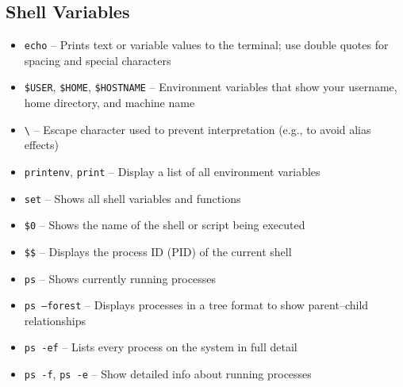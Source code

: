 \documentclass[a4paper,12pt=]{article}
\begin{document}
\subsection{Shell Variables}
    \begin{itemize}
        \item \texttt{echo} – Prints text or variable values to the terminal; use double quotes for spacing and special characters
        \item \texttt{\$USER}, \texttt{\$HOME}, \texttt{\$HOSTNAME} – Environment variables that show your username, home directory, and machine name
        \item \texttt{\textbackslash} – Escape character used to prevent interpretation (e.g., to avoid alias effects)
        \item \texttt{printenv}, \texttt{print} – Display a list of all environment variables
        \item \texttt{set} – Shows all shell variables and functions
        \item \texttt{\$0} – Shows the name of the shell or script being executed
        \item \texttt{\$\$} – Displays the process ID (PID) of the current shell
        \item \texttt{ps} – Shows currently running processes
        \item \texttt{ps --forest} – Displays processes in a tree format to show parent–child relationships
        \item \texttt{ps -ef} – Lists every process on the system in full detail
        \item \texttt{ps -f}, \texttt{ps -e} – Show detailed info about running processes
    \end{itemize}
\end{document}
